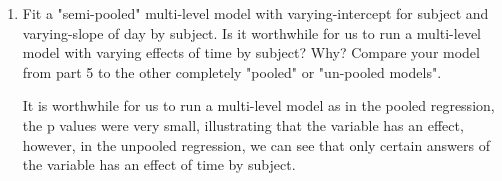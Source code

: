 \documentclass[12pt,letterpaper]{article}
\begin{document}
\begin{enumerate}
	\item Fit a "semi-pooled" multi-level model with varying-intercept for subject and varying-slope of day by subject. Is it worthwhile for us to run a multi-level model with varying effects of time by subject? Why? Compare your model from part 5 to the other completely "pooled" or "un-pooled models".

It is worthwhile for us to run a multi-level model as in the pooled regression, the p values were very small, illustrating that the variable has an effect, however, in the unpooled regression, we can see that only certain answers of the variable has an effect of time by subject. 
\end{enumerate}
\end{document}
